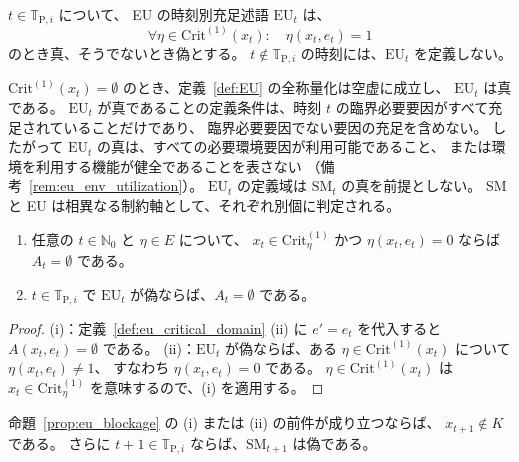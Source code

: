 \begin{definition}[EU の時刻別充足述語]
\label{def:EU}
$t\in\mathbb{T}_{\mathrm{P},i}$ について、
EU の時刻別充足述語 $\mathrm{EU}_t$ は、
\[
  \forall\eta\in\mathrm{Crit}^{(1)}(x_t):\quad \eta(x_t,e_t)=1
\]
のとき真、そうでないとき偽とする。
$t\notin\mathbb{T}_{\mathrm{P},i}$ の時刻には、$\mathrm{EU}_t$ を定義しない。
\end{definition}

\begin{remark}[EU の真が表すことの範囲]
\label{rem:eu_vacuous}
$\mathrm{Crit}^{(1)}(x_t)=\emptyset$ のとき、定義~\ref{def:EU} の全称量化は空虚に成立し、
$\mathrm{EU}_t$ は真である。
$\mathrm{EU}_t$ が真であることの定義条件は、時刻 $t$ の臨界必要要因がすべて充足されていることだけであり、
臨界必要要因でない要因の充足を含めない。
したがって $\mathrm{EU}_t$ の真は、すべての必要環境要因が利用可能であること、
または環境を利用する機能が健全であることを表さない
（備考~\ref{rem:eu_env_utilization}）。
$\mathrm{EU}_t$ の定義域は $\mathrm{SM}_t$ の真を前提としない。
SM と EU は相異なる制約軸として、それぞれ別個に判定される。
\end{remark}

\begin{proposition}[臨界必要要因の非充足と閉塞]
\label{prop:eu_blockage}
\begin{enumerate}[label=(\roman*)]
  \item 任意の $t\in\mathbb{N}_0$ と $\eta\in E$ について、
  $x_t\in\mathrm{Crit}^{(1)}_\eta$ かつ $\eta(x_t,e_t)=0$ ならば $A_t=\emptyset$ である。
  \item $t\in\mathbb{T}_{\mathrm{P},i}$ で $\mathrm{EU}_t$ が偽ならば、$A_t=\emptyset$ である。
\end{enumerate}
\end{proposition}

\begin{proof}
(i)：定義~\ref{def:eu_critical_domain} (ii) に $e'=e_t$ を代入すると $A(x_t,e_t)=\emptyset$ である。
(ii)：$\mathrm{EU}_t$ が偽ならば、ある $\eta\in\mathrm{Crit}^{(1)}(x_t)$ について $\eta(x_t,e_t)\neq1$、
すなわち $\eta(x_t,e_t)=0$ である。
$\eta\in\mathrm{Crit}^{(1)}(x_t)$ は $x_t\in\mathrm{Crit}^{(1)}_\eta$ を意味するので、(i) を適用する。
\end{proof}

\begin{proposition}[臨界必要要因の非充足と次時刻の状態]
\label{prop:eu_sm_next}
命題~\ref{prop:eu_blockage} の (i) または (ii) の前件が成り立つならば、
$x_{t+1}\notin K$ である。
さらに $t+1\in\mathbb{T}_{\mathrm{P},i}$ ならば、$\mathrm{SM}_{t+1}$ は偽である。
\end{proposition}

